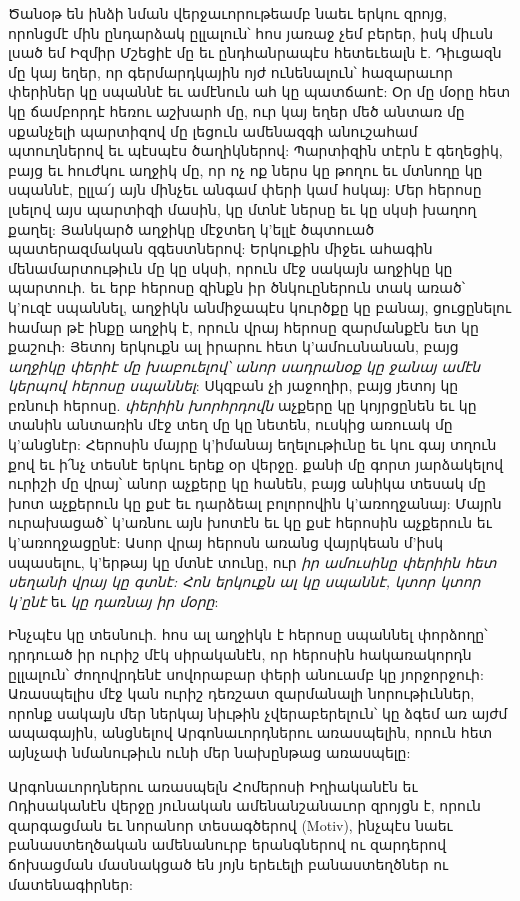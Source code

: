 \documentclass{article}
\begin{document}
{Ծանօթ են ինձի նման վերջաւորութեամբ նաեւ երկու զրոյց, որոնցմէ մին ընդարձակ ըլլալուն՝ հոս յառաջ չեմ բերեր, իսկ միւսն լսած եմ Իզմիր Մշեցիէ մը եւ ընդհանրապէս հետեւեալն է. Դիւցազն մը կայ եղեր, որ գերմարդկային ոյժ ունենալուն՝ հազարաւոր փերիներ կը սպաննէ եւ ամէնուն ահ կը պատճաոէ: Օր մը մօրը հետ կը ճամբորդէ հեռու աշխարհ մը, ուր կայ եղեր մեծ անտառ մը սքանչելի պարտիզով մը լեցուն ամենազգի անուշահամ պտուղներով եւ պէսպէս ծաղիկներով: Պարտիզին տէրն է գեղեցիկ, բայց եւ հուժկու աղջիկ մը, որ ոչ ոք ներս կը թողու եւ մտնողը կը սպաննէ, ըլլա՛յ այն մինչեւ անգամ փերի կամ հսկայ: Մեր հերոսը լսելով այս պարտիզի մասին, կը մտնէ ներսը եւ կը սկսի խաղող քաղել: Յանկարծ աղջիկը մէջտեղ կ'ելլէ ծպտուած պատերազմական զգեստներով: Երկուքին միջեւ ահագին մենամարտութիւն մը կը սկսի, որուն մէջ սակայն աղջիկը կը պարտուի. եւ երբ հերոսը զինքն իր ծնկուըներուն տակ առած՝ կ'ուզէ սպաննել, աղջիկն անմիջապէս կուրծքը կը բանայ, ցուցընելու համար թէ ինքը աղջիկ է, որուն վրայ հերոսը զարմանքէն ետ կը քաշուի: Յետոյ երկուքն ալ իրարու հետ կ'ամուսնանան, բայց \emph{աղջիկը փերիէ մը խաբուելով՝ անոր սադրանօք կը ջանայ ամէն կերպով հերոսը սպաննել}: Սկզբան չի յաջողիր, բայց յետոյ կը բռնուի հերոսը. \emph{փերիին խորհրդովն} աչքերը կը կոյրցընեն եւ կը տանին անտառին մէջ տեղ մը կը նետեն, ուսկից առուակ մը կ'անցնէր: Հերոսին մայրը կ'իմանայ եղելութիւնը եւ կու գայ տղուն քով եւ ի՛նչ տեսնէ երկու երեք օր վերջը. քանի մը գորտ յարձակելով ուրիշի մը վրայ՝ անոր աչքերը կը հանեն, բայց անիկա տեսակ մը խոտ աչքերուն կը քսէ եւ դարձեալ բոլորովին կ'առողջանայ: Մայրն ուրախացած՝ կ'առնու այն խոտէն եւ կը քսէ հերոսին աչքերուն եւ կ'առողջացընէ: Ասոր վրայ հերոսն առանց վայրկեան մ'իսկ սպասելու, կ'երթայ կը մտնէ տունը, ուր \emph{իր ամուսինը փերիին հետ սեղանի վրայ կը գտնէ: Հոն երկուքն ալ կը սպաննէ, կտոր կտոր կ'ընէ} եւ \emph{կը դառնայ իր մօրը}:

Ինչպէս կը տեսնուի. հոս ալ աղջիկն է հերոսը սպաննել փորձողը՝ դրդուած իր ուրիշ մէկ սիրականէն, որ հերոսին հակառակորդն ըլլալուն՝ ժողովրդենէ սովորաբար փերի անուամբ կը յորջորջուի: Առասպելիս մէջ կան ուրիշ դեռշատ զարմանալի նորութիւններ, որոնք սակայն մեր ներկայ նիւթին չվերաբերելուն՝ կը ձգեմ առ այժմ ապագային, անցնելով Արգոնաւորդներու առասպելին, որուն հետ այնչափ նմանութիւն ունի մեր նախընթաց առասպելը:

Արգոնաւորդներու առասպելն Հոմերոսի Իղիականէն եւ Ոդիսականէն վերջը յունական ամենանշանաւոր զրոյցն է, որուն զարգացման եւ նորանոր տեսագծերով (Motiv), ինչպէս նաեւ բանաստեղծական ամենանուրբ երանգներով ու զարդերով ճոխացման մասնակցած են յոյն երեւելի բանաստեղծներ ու մատենագիրներ: 

}
\end{document}
